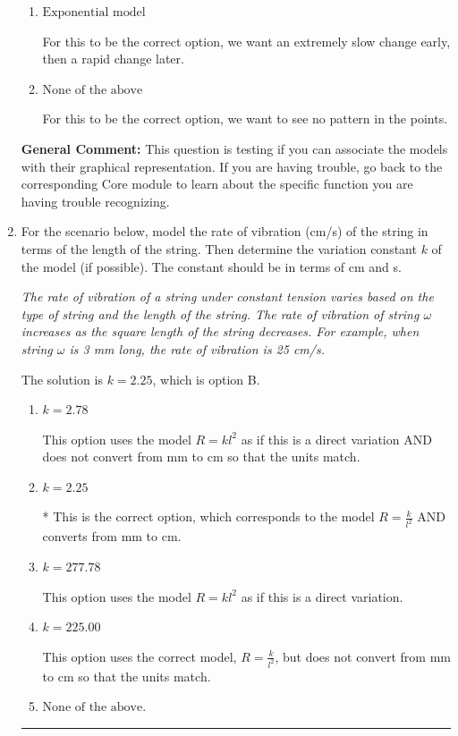 \documentclass{extbook}[14pt]
\newcommand{\litem}[1]{\item #1

\rule{\textwidth}{0.4pt}}
\begin{document}
\begin{enumerate}
{\begin{enumerate}[label=\Alph*.]
For this to be the correct option, we need to see a polynomial or rational shape.
\item \( \text{Exponential model} \)

For this to be the correct option, we want an extremely slow change early, then a rapid change later.
\item \( \text{None of the above} \)

For this to be the correct option, we want to see no pattern in the points.
\end{enumerate}

\textbf{General Comment:} This question is testing if you can associate the models with their graphical representation. If you are having trouble, go back to the corresponding Core module to learn about the specific function you are having trouble recognizing.
}
\litem{
For the scenario below, model the rate of vibration (cm/s) of the string in terms of the length of the string. Then determine the variation constant $k$ of the model (if possible). The constant should be in terms of cm and s.

\begin{center}
    \textit{ The rate of vibration of a string under constant tension varies based on the type of string and the length of the string. The rate of vibration of string $\omega$ increases as the square length of the string decreases. For example, when string $\omega$ is 3 mm long, the rate of vibration is 25 cm/s. }
\end{center}
The solution is \( k = 2.25 \), which is option B.\begin{enumerate}[label=\Alph*.]
\item \( k = 2.78 \)

This option uses the model $R = kl^{2}$ as if this is a direct variation AND does not convert from mm to cm so that the units match.
\item \( k = 2.25 \)

* This is the correct option, which corresponds to the model $R = \frac{k}{l^{2}}$ AND converts from mm to cm.
\item \( k = 277.78 \)

This option uses the model $R = kl^{2}$ as if this is a direct variation.
\item \( k = 225.00 \)

This option uses the correct model, $R = \frac{k}{l^{2}}$, but does not convert from mm to cm so that the units match.
\item \( \text{None of the above.} \)


\end{enumerate}}
\end{enumerate}
\end{document}

